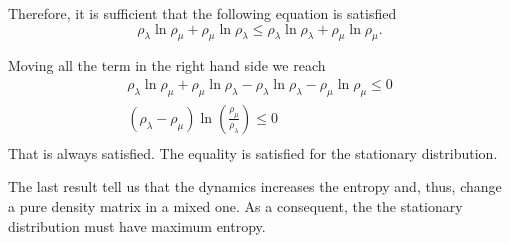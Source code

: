 Therefore, it is sufficient that the following equation is satisfied
\begin{equation}
    \rho_\lambda\ln\rho_\mu + \rho_\mu\ln\rho_\lambda\leq \rho_\lambda\ln\rho_\lambda+ \rho_\mu\ln\rho_\mu.
\end{equation}

Moving all the term in the right hand side we reach
\begin{equation}
    \begin{split}
        \rho_\lambda\ln\rho_\mu + \rho_\mu\ln\rho_\lambda - \rho_\lambda\ln\rho_\lambda- \rho_\mu\ln\rho_\mu \leq 0\\
        \left(\rho_\lambda-\rho_\mu\right)\ln\left(\frac{\rho_\mu}{\rho_\lambda}\right) \leq0\\
    \end{split}
\end{equation}
That is always satisfied. The equality is satisfied for the stationary distribution.

The last result tell us that the dynamics increases the entropy and, thus, change a pure density matrix in a mixed one.
As a consequent, the the stationary distribution must have maximum entropy.